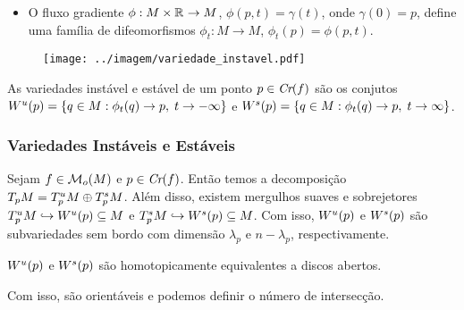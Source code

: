 \documentclass{beamer}
\begin{document}
\begin{footnotesize}
\begin{frame}
\begin{minipage}[t]{0.67\linewidth}
\begin{itemize}
			\item O fluxo gradiente $\phi:M\times \mathbb{R}^{}
			\to M$, $\phi(p,t) =\gamma(t)$, onde $\gamma(0) = p$, define uma família de difeomorfismos $\phi_{t}:M\to M$, $\phi_{t}(p) = \phi(p,t)$.
		\end{itemize}	
		\end{minipage}
		\hfill%
		\begin{minipage}[t]{0.30\linewidth}
			\begin{figure}[!h]
				\centering
				\texttt{[image: ../imagem/variedade\_instavel.pdf]}
			\end{figure}
		\end{minipage}
		\begin{definicao}
			As variedades instável e estável de um ponto $p \in \textit{Cr}(f)$ são os conjutos $W^{u}(p) = \{q\in M: \phi_{t}(q) \to p,\; t\to -\infty\}$ e $W^{s}(p) = \{q\in M: \phi_{t}(q) \to p,\; t\to \infty\}$.
		\end{definicao}
		
	\end{frame}
	
	\begin{frame}
		\frametitle{Variedades Instáveis e Estáveis}
		\begin{teorema}
			Sejam $f \in \mathcal{M}_{o}(M)$ e $p \in \textit{Cr}(f)$. Então temos a decomposição $T_{p}M=T^{u}_{p}M\oplus T^{s}_{p}M$. Além disso, existem mergulhos suaves e sobrejetores $T^{u}_{p}M \hookrightarrow W^{u}(p) \subseteq M$ e $T^{s}_{p}M \hookrightarrow W^{s}(p) \subseteq M$. Com isso, $W^{u}(p)$ e $W^{s}(p)$ são subvariedades sem bordo com dimensão $\lambda_{p}$ e $n-\lambda_{p}$, respectivamente.
		\end{teorema}
	
		\begin{observacao}
			$W^{u}(p)$ e $W^{s}(p)$ são homotopicamente equivalentes a discos abertos.
		\end{observacao}
		
		\begin{tiny}
			Com isso, são orientáveis e podemos definir o número de intersecção.
		\end{tiny}
	\end{frame}
	

\end{footnotesize}
\end{document}
